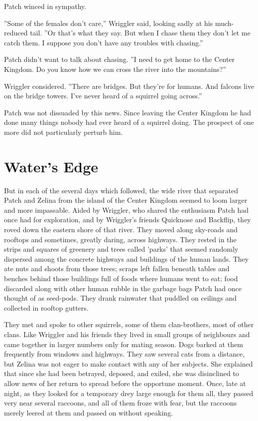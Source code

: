 \documentclass[12pt]{book}
\begin{document}
Patch winced in sympathy.

''Some of the females don't care,'' Wriggler said, looking sadly at his much-reduced tail. ''Or that's what they say. But when I chase them they don't let me catch them. I suppose you don't have any troubles with chasing.''

Patch didn't want to talk about chasing. ''I need to get home to the Center Kingdom. Do you know how we can cross the river into the mountains?''

Wriggler considered. ''There are bridges. But they're for humans. And falcons live on the bridge towers. I've never heard of a squirrel going across.''

Patch was not dissuaded by this news. Since leaving the Center Kingdom he had done many things nobody had ever heard of a squirrel doing. The prospect of one more did not particularly perturb him.


\section{Water's Edge}

But in each of the several days which followed, the wide river that separated Patch and Zelina from the island of the Center Kingdom seemed to loom larger and more impassable. Aided by Wriggler, who shared the enthusiasm Patch had once had for exploration, and by Wriggler's friends Quicknose and Backflip, they roved down the eastern shore of that river. They moved along sky-roads and rooftops and sometimes, greatly daring, across highways. They rested in the strips and squares of greenery and trees called 'parks' that seemed randomly dispersed among the concrete highways and buildings of the human lands. They ate nuts and shoots from those trees; scraps left fallen beneath tables and benches behind those buildings full of foods where humans went to eat; food discarded along with other human rubble in the garbage bags Patch had once thought of as seed-pods. They drank rainwater that puddled on ceilings and collected in rooftop gutters.

They met and spoke to other squirrels, some of them clan-brothers, most of other clans. Like Wriggler and his friends they lived in small groups of neighbours and came together in larger numbers only for mating season. Dogs barked at them frequently from windows and highways. They saw several cats from a distance, but Zelina was not eager to make contact with any of her subjects. She explained that since she had been betrayed, deposed, and exiled, she was disinclined to allow news of her return to spread before the opportune moment. Once, late at night, as they looked for a temporary drey large enough for them all, they passed very near several raccoons, and all of them froze with fear, but the raccoons merely leered at them and passed on without speaking.
\end{document}
